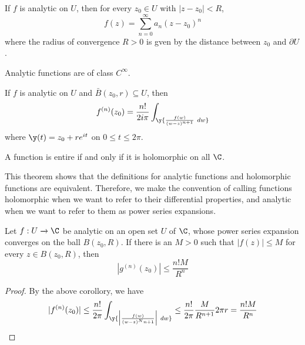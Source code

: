 \begin{corollary}
    If $f$ is analytic on $U$, then for every $z_0 \in U$ with $|z-z_0|<R$,
    \begin{equation*}
        f(z)=\sum_{n=0}^\infty{a_n(z-z_0)^n}
    \end{equation*}
    where the radius of convergence $R>0$ is gven by the distance between $z_0$
    and $\partial{U}$.
\end{corollary}
\begin{corollary}
    Analytic functions are of class $C^\infty$.
\end{corollary}
\begin{corollary}
    If $f$ is analytic on $U$ and $\bar{B}(z_0,r) \subseteq U$, then
    \begin{equation*}
        f^{(n)}(z_0)=\frac{n!}{2i\pi}\int_\y{\frac{f(w)}{(w-z)^{n+1}} \ dw}
    \end{equation*}
    where $\y(t)=z_0+re^{it}$ on $0 \leq t \leq 2\pi$.
\end{corollary}
\begin{corollary}
    A function is entire if and only if it is holomorphic on all $\C$.
\end{corollary}
\begin{remark}
    This theorem shows that the definitions for analytic functions and
    holomorphic functions are equivalent. Therefore, we make the convention of
    calling functions holomorphic when we want to refer to their differential
    properties, and analytic when we want to refer to them as power series
    expansions.
\end{remark}

\begin{theorem}\label{4.3.5}
    Let $f:U \xrightarrow{} \C$ be analytic on an open set $U$ of  $\C$, whose
    power series expansion converges on the ball $B(z_0,R)$. If there is
    an $M>0$ such that  $|f(z)| \leq M$ for every $z \in B(z_0,R)$, then
    \begin{equation*}
        |g^{(n)}(z_0)| \leq \frac{n!M}{R^n}
    \end{equation*}
\end{theorem}
\begin{proof}
    By the above corollory, we have
    \begin{equation*}
        |f^{(n)}(z_0)| \leq
        \frac{n!}{2\pi}\int_\y{\Big{|} \frac{f(w)}{(w-z)^N{n+1}} \Big{|} \ dw}
        \leq \frac{n!}{2\pi}\frac{M}{R^{n+1}}2\pi{r}=\frac{n!M}{R^n}
    \end{equation*}
\end{proof}

